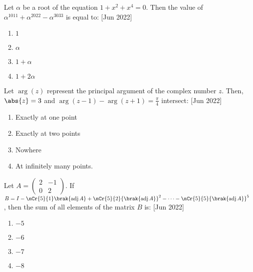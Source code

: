 \iffalse
  \title{Assignment}
  \author{EE24BTECH11044}
  \section{mcq-single}
\fi

	\item Let $\alpha$ be a root of the equation $1+x^2+x^4=0$. Then the value of ${\alpha}^{1011}+{\alpha}^{2022}-{\alpha}^{3033}$ is equal to: \hfill{[Jun 2022]}
		\begin{enumerate}
			\item $1$\\
			\item $\alpha$\\
			\item $1+\alpha$\\
			\item $1+2\alpha$\\
		\end{enumerate}
	\item Let $\arg(z)$ represent the principal argument of the complex number $z$. Then, $\abs{z}=3$ and $\arg(z-1)-\arg(z+1)=\frac{\pi}{4}$ intersect: \hfill{[Jun 2022]}
		\begin{enumerate}
			\item Exactly at one point\\
			\item Exactly at two points\\
			\item Nowhere\\
			\item At infinitely many points.\\
		\end{enumerate}
	\item Let $A=\begin{pmatrix} 2 & -1 \\ 0 & 2 \end{pmatrix}$. If $B=I-\nCr{5}{1}\brak{\operatorname{adj}A}+\nCr{5}{2}{\brak{\operatorname{adj}A}}^2-\dots-\nCr{5}{5}{\brak{\operatorname{adj}A}}^5$, then the sum of all elements of the matrix $B$ is: \hfill{[Jun 2022]}
			\begin{enumerate}
				\item $-5$\\
				\item $-6$\\
				\item $-7$\\
				\item $-8$\\
			\end{enumerate}
